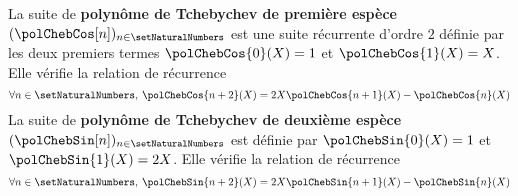 \begin{definition}
\label{definition:polynome_de_tchebychev}
La suite de \textbf{polynôme de Tchebychev de première espèce} $(\polChebCos[n])_{n \in \setNaturalNumbers}$ est une suite récurrente d'ordre $2$ définie par les deux premiers termes $\polChebCos{0}(X) = 1$ et $\polChebCos{1}(X) = X$. Elle vérifie la relation de récurrence
\[
\forall n \in \setNaturalNumbers,\:  \polChebCos{n+2}(X) = 2 X \polChebCos{n+1}(X) - \polChebCos{n}(X)
\]
La suite de \textbf{polynôme de Tchebychev de deuxième espèce} $(\polChebSin[n])_{n \in \setNaturalNumbers}$ est définie par $\polChebSin{0}(X) = 1$ et $\polChebSin{1}(X) = 2X$. Elle vérifie la relation de récurrence
\[
\forall n \in \setNaturalNumbers,\: \polChebSin{n+2}(X) = 2 X \polChebSin{n+1}(X) - \polChebSin{n}(X)
\]
\end{definition}
